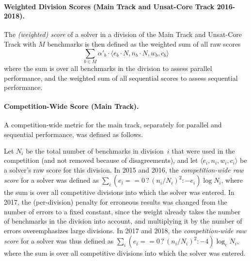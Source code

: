 \documentclass[dvipsnames,table,twoside,11pt]{article}
\newcommand{\maintrack}{Main Track\xspace}
\newcommand{\ucoretrack}{Unsat-Core Track\xspace}
\begin{document}
\paragraph{Weighted Division Scores (\maintrack and \ucoretrack 2016-2018).}
The \emph{(weighted) score} of a solver in a division of the \maintrack and
\ucoretrack with $M$ benchmarks is then defined as the weighted sum of all raw
scores $$\sum_{b\in M} \alpha'_b \cdot \langle e_b \cdot N, n_b \cdot N,
w_b, c_b\rangle$$ where the sum is over all benchmarks in the division to
assess parallel performance, and the weighted sum of all sequential scores to
assess sequential performance.

\paragraph{Competition-Wide Score (\maintrack).}
A competition-wide metric for the main track, separately for
parallel and sequential performance, was defined as follows.

Let $N_i$ be the total number of benchmarks in division~$i$ that were used in the
competition (and not removed because of disagreements), and let $\langle e_i, n_i, w_i, c_i\rangle$ be a solver's
raw score for this division.
%
In 2015 and 2016,
the \emph{competition-wide raw score} for a solver was defined as
%
$\sum_i (e_i == 0 \,?\, (n_i/N_i)^2 : -e_i) \log N_i$,
%
where the sum is over all competitive
divisions into which the solver was
entered.
%
In 2017, the (per-division) penalty for erroneous results was changed from the
number of errors to a fixed constant, since the weight already takes the number
of benchmarks in the division into account, and multiplying it by the number of
errors overemphasizes large divisions.
In 2017 and 2018,
the \emph{competition-wide raw score} for a solver was thus defined as
%
$\sum_i (e_i == 0 \,?\, (n_i/N_i)^2 : -4) \log_e N_i$,
%
where the sum is over all competitive divisions into which the solver
was entered.
\end{document}
